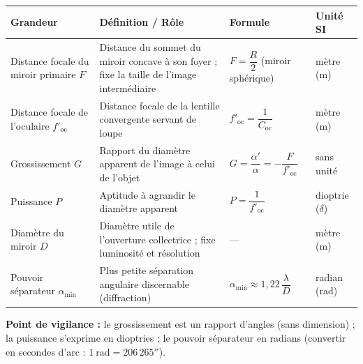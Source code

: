 \documentclass[11pt]{article}
\begin{document}
\begin{corrige}
\begin{center}
\begin{tabularx}{\linewidth}{|l|X|X|X|}\hline
\rowcolor{popblueL}
\textbf{Grandeur} & \textbf{Définition / Rôle} & \textbf{Formule} & \textbf{Unité SI} \\ \hline
Distance focale du miroir primaire $F$ & Distance du sommet du miroir concave à son foyer ; fixe la taille de l'image intermédiaire & $F = \dfrac{R}{2}$ (miroir sphérique) & mètre (m) \\ \hline
Distance focale de l'oculaire $f'_{\text{oc}}$ & Distance focale de la lentille convergente servant de loupe & $f'_{\text{oc}} = \dfrac{1}{C_{\text{oc}}}$ & mètre (m) \\ \hline
Grossissement $G$ & Rapport du diamètre apparent de l'image à celui de l'objet & $G = \dfrac{\alpha'}{\alpha} = -\dfrac{F}{f'_{\text{oc}}}$ & sans unité \\ \hline
Puissance $P$ & Aptitude à agrandir le diamètre apparent & $P = \dfrac{1}{f'_{\text{oc}}}$ & dioptrie ($\delta$) \\ \hline
Diamètre du miroir $D$ & Diamètre utile de l'ouverture collectrice ; fixe luminosité et résolution & --- & mètre (m) \\ \hline
Pouvoir séparateur $\alpha_{\min}$ & Plus petite séparation angulaire discernable (diffraction) & $\alpha_{\min} \approx 1,22\,\dfrac{\lambda}{D}$ & radian (rad) \\ \hline
\end{tabularx}
\end{center}
\textbf{Point de vigilance :} le grossissement est un rapport d'angles (sans dimension) ; la puissance s'exprime en dioptries ; le pouvoir séparateur en radians (convertir en secondes d'arc : $1\ \text{rad} = 206\,265''$).
\end{corrige}
\end{document}
